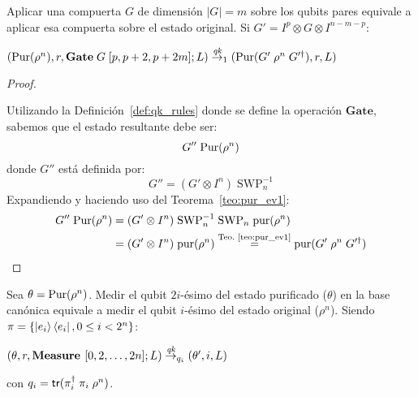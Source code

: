 \begin{teorema}
\label{teo:pur_gate}
Aplicar una compuerta $G$ de dimensión $|G|=m$ sobre los qubits pares equivale a aplicar esa compuerta sobre el estado original. Si $G' = I^p \otimes G \otimes I^{n-m-p}$:

$(\text{Pur}(\rho^n), r, \textbf{Gate}\;G\;[p, p+2, p + 2m];L) \overset{\textit{qk}}{\rightarrow}_1 (\text{Pur}(G'\;\rho^n \;G'^\dagger), r, L)$
\end{teorema}
\begin{proof}$\;$

Utilizando la Definición~\ref{def:qk_rules} donde se define la operación $\textbf{Gate}$, sabemos que el estado resultante debe ser:
\[G''\;\text{Pur}(\rho^n)\]
donde $G''$ está definida por:
\[G''= (G' \otimes I^n)\;\text{SWP}_n^{-1}\]
Expandiendo y haciendo uso del Teorema~\ref{teo:pur_ev1}:
\begin{align*}
G''\;\text{Pur}(\rho^n) &=  (G' \otimes I^n)\;\text{SWP}_n^{-1}\;\text{SWP}_n\;\text{pur}(\rho^n) \\
&= (G' \otimes I^n)\;\text{pur}(\rho^n)  \stackrel{\textrm{Teo.~\ref{teo:pur_ev1}}}{=} \text{pur}(G'\;\rho^n\;G'^\dagger)
\end{align*}

\end{proof}

\begin{teorema}
\label{teo:pur_meas}
Sea $\theta = \text{Pur}(\rho^n)$. Medir el qubit $2i$-ésimo del estado purificado ($\theta$) en la base canónica equivale a medir el qubit $i$-ésimo del estado original ($\rho^n$). Siendo $\pi = \{\ket{e_i}\bra{e_i}, 0\leq i < 2^n \}$:

$(\theta, r, \textbf{Measure } [0, 2, \dots, 2n];L) \overset{\textit{qk}}{\rightarrow}_{q_i} (\theta', i, L)$

con $q_i=\mathsf{tr}(\pi_i^\dagger\;\pi_i\;\rho^n)$.

\end{teorema}

